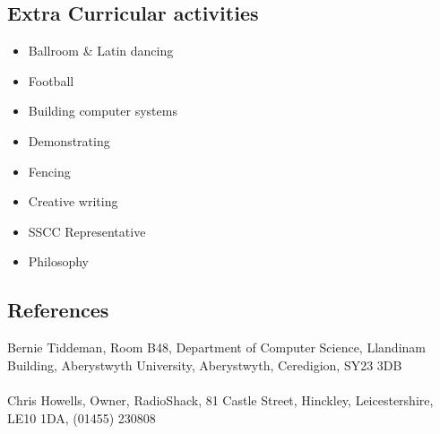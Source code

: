 \documentclass[0pt]{article}
\begin{document}
\subsection*{Extra Curricular activities}
\begin{itemize}
	\item Ballroom \& Latin dancing
	\item Football
	\item Building computer systems
	\item Demonstrating
	\item Fencing
	\item Creative writing
	\item SSCC Representative 
	\item Philosophy 
\end{itemize}

\subsection*{References}
Bernie Tiddeman, Room B48, Department of Computer Science, Llandinam Building, Aberystwyth University, Aberystwyth, Ceredigion, SY23 3DB
\\\\
Chris Howells, Owner, RadioShack, 81 Castle Street, Hinckley, Leicestershire, LE10 1DA,
(01455) 230808 
\end{document}
